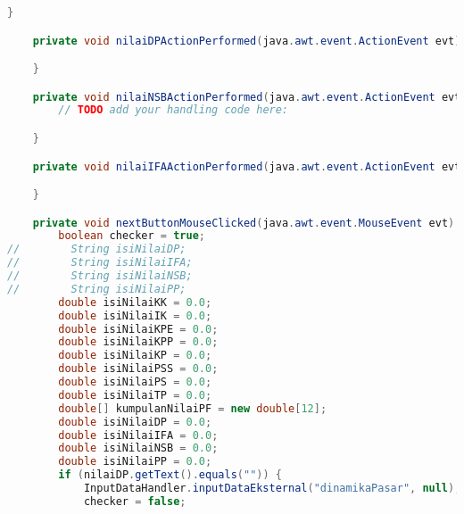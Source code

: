 \begin{lstlisting}[language=Java, caption=TampilanKondisiEksternal.java]
    }                                       

    private void nilaiDPActionPerformed(java.awt.event.ActionEvent evt) {                                        

    }                                       

    private void nilaiNSBActionPerformed(java.awt.event.ActionEvent evt) {                                         
        // TODO add your handling code here:

    }                                        

    private void nilaiIFAActionPerformed(java.awt.event.ActionEvent evt) {                                         

    }                                        

    private void nextButtonMouseClicked(java.awt.event.MouseEvent evt) {                                        
        boolean checker = true;
//        String isiNilaiDP;
//        String isiNilaiIFA;
//        String isiNilaiNSB;
//        String isiNilaiPP;
        double isiNilaiKK = 0.0;
        double isiNilaiIK = 0.0;
        double isiNilaiKPE = 0.0;
        double isiNilaiKPP = 0.0;
        double isiNilaiKP = 0.0;
        double isiNilaiPSS = 0.0;
        double isiNilaiPS = 0.0;
        double isiNilaiTP = 0.0;
        double[] kumpulanNilaiPF = new double[12];
        double isiNilaiDP = 0.0;
        double isiNilaiIFA = 0.0;
        double isiNilaiNSB = 0.0;
        double isiNilaiPP = 0.0;
        if (nilaiDP.getText().equals("")) {
            InputDataHandler.inputDataEksternal("dinamikaPasar", null);
            checker = false;


\end{lstlisting}
